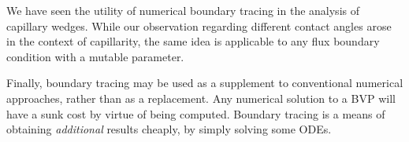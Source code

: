 \thematicbreak

We have seen the utility of numerical boundary tracing
in the analysis of capillary wedges.
While our observation regarding different contact angles
arose in the context of capillarity,
the same idea is applicable
to any flux boundary condition with a mutable parameter.

Finally, boundary tracing may be used
as a supplement to conventional numerical approaches,
rather than as a replacement.
Any numerical solution to a BVP will have a sunk cost
by virtue of being computed.
Boundary tracing is a means of obtaining \emph{additional} results cheaply,
by simply solving some ODEs.
